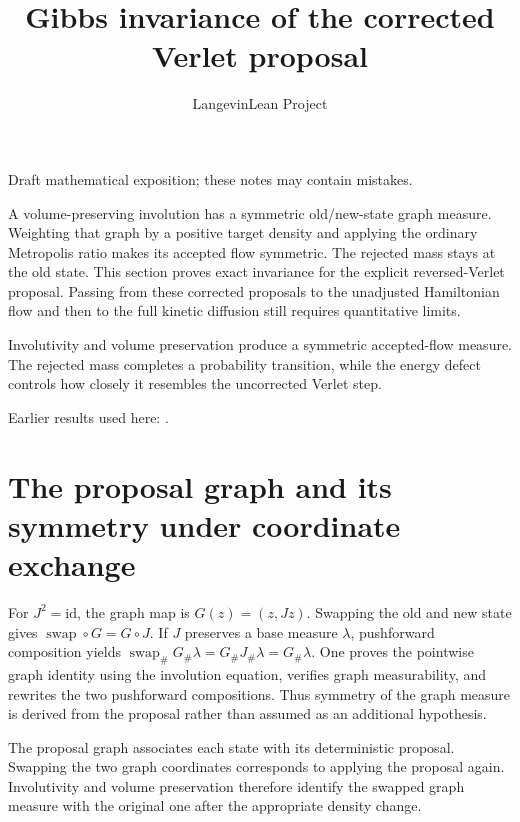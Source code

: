 \documentclass[11pt,a4paper]{article}
\title{\texorpdfstring{Gibbs invariance of the corrected Verlet proposal}{Gibbs invariance of the corrected Verlet proposal}}
\author{LangevinLean Project}
\date{}
\begin{document}
\maketitle
Draft mathematical exposition; these notes may contain mistakes.


A volume-preserving involution has a symmetric old/\allowbreak{}new-state graph measure. Weighting that graph by a positive target density and applying the ordinary Metropolis ratio makes its accepted flow symmetric. The rejected mass stays at the old state. This section proves exact invariance for the explicit reversed-Verlet proposal. Passing from these corrected proposals to the unadjusted Hamiltonian flow and then to the full kinetic diffusion still requires quantitative limits.



Involutivity and volume preservation produce a symmetric accepted-flow measure. The rejected mass completes a probability transition, while the energy defect controls how closely it resembles the uncorrected Verlet step.



Earlier results used here: \cite[Section~3.35]{LangevinLean2026ULASC}.

\section{\texorpdfstring{The proposal graph and its symmetry under coordinate exchange}{The proposal graph and its symmetry under coordinate exchange}}


For \(J^2=\mathrm{id}\), the graph map is \(G(z)=(z,Jz)\). Swapping the old and new state gives \(\operatorname{swap}\circ G=G\circ J\). If \(J\) preserves a base measure \(\lambda\), pushforward composition yields \(\operatorname{swap}_\#G_\#\lambda=G_\#J_\#\lambda=G_\#\lambda\). One proves the pointwise graph identity using the involution equation, verifies graph measurability, and rewrites the two pushforward compositions. Thus symmetry of the graph measure is derived from the proposal rather than assumed as an additional hypothesis.



The proposal graph associates each state with its deterministic proposal. Swapping the two graph coordinates corresponds to applying the proposal again. Involutivity and volume preservation therefore identify the swapped graph measure with the original one after the appropriate density change.
\end{document}
